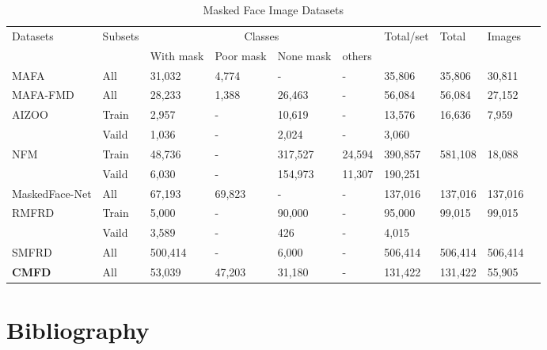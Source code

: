 \documentclass[a4paper,fleqn]{cas-dc}
\begin{document}
\begin{table}[h!t]
  \center
  \caption{Masked Face Image Datasets}
    \begin{tabular}{llllllllll}
    \toprule
    \multirow{2}{*}{Datasets} & \multirow{2}{*}{Subsets} & \multicolumn{4}{c}{Classes}  & \multirow{2}{*}{Total/set} & \multirow{2}{*}{Total} & \multirow{2}{*}{Images} \\
\cmidrule{3-6}          &       & With mask & Poor mask & None mask & others &       &       &  \\
    \midrule
    MAFA  & All   & 31,032 & 4,774  & -     & -     & 35,806 & 35,806 & 30,811 \\
    MAFA-FMD  & All   & 28,233 & 1,388  & 26,463 & -     & 56,084 & 56,084 & 27,152 \\
    \multirow{2}{*}{AIZOO } & Train & 2,957  & -     & 10,619 & -     & 13,576 & \multirow{2}{*}{16,636} & \multirow{2}{*}{7,959} \\
          & Vaild & 1,036  & -     & 2,024  & -     & 3,060  &       &  \\

    \multirow{2}{*}{NFM } & Train & 48,736 & -     & 317,527 & 24,594 & 390,857 & \multirow{2}{*}{581,108} & \multirow{2}{*}{18,088} \\
          & Vaild & 6,030  & -     & 154,973 & 11,307 & 190,251 &       &  \\

    MaskedFace-Net  & All   & 67,193 & 69,823 & -     & -     & 137,016 & 137,016 & 137,016 \\
 
    \multirow{2}{*}{RMFRD } & Train & 5,000  & -     & 90,000 & -     & 95,000 & \multirow{2}{*}{99,015} & \multirow{2}{*}{99,015} \\
          & Vaild & 3,589  & -     & 426   & -     & 4,015  &       &  \\

    SMFRD  & All   & 500,414 & -     & 6,000  & -     & 506,414 & 506,414 & 506,414 \\
 
    \textbf{CMFD} & All   & 53,039 & 47,203 & 31,180 & -     & 131,422 & 131,422 & 55,905 \\
    \bottomrule
    \end{tabular}%
  \label{table1}%
\end{table}%

\section{Bibliography}
\end{document}

